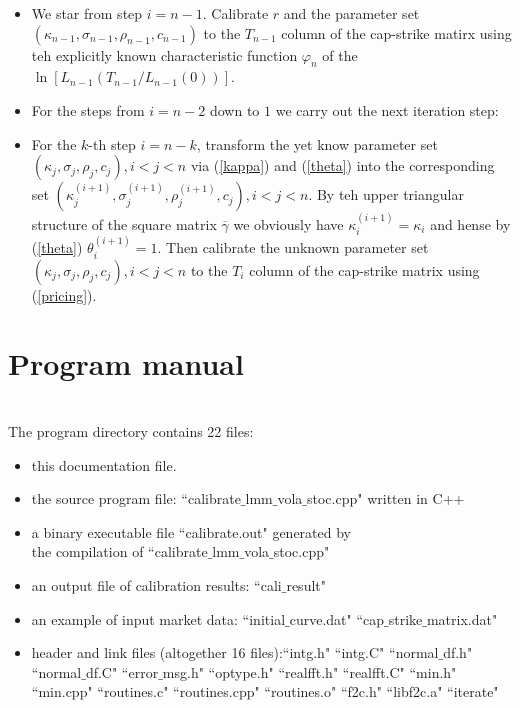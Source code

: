 \documentclass[12pt]{article}
\theoremstyle{definition}
\numberwithin{equation}{section} \theoremstyle{remark}
\begin{document}
\begin{itemize} \item We star from step $i=n-1$. Calibrate $r$ and the parameter set $(\kappa_{n-1}, \sigma_{n-1}, \rho_{n-1}, c_{n-1})$ to the $T_{n-1}$ column of the cap-strike matirx using teh explicitly known characteristic function $\varphi_n$ of the $\ln[L_{n-1}(T_{n-1}/L_{n-1}(0))]$.\\
\item For the steps from $i=n-2$ down to $1$ we carry out the next iteration step:\\
\item For the $k$-th step $i=n-k$, transform the yet know parameter set $(\kappa_j, \sigma_j, \rho_j, c_j), i<j<n$  via (\ref{kappa}) and (\ref{theta}) into the corresponding set $(\kappa_j^{(i+1)}, \sigma_j^{(i+1)}, \rho_j^{(i+1)}, c_j), i<j<n$. By teh upper triangular structure of the square matrix $\overline{\gamma}$ we obviously have $\kappa_i^{(i+1)}=\kappa_i$ and hense by (\ref{theta}) $\theta_i^{(i+1)}=1$. Then calibrate the unknown parameter set $(\kappa_j, \sigma_j, \rho_j, c_j), i<j<n$ to the $T_i$ column of the cap-strike matrix using (\ref{pricing}).\\
\end{itemize}


\section{Program manual}
\\
\noindent The program directory contains 22 files:\\
\begin{itemize}
\item this documentation file.
\item the source program file: ``calibrate$\_$lmm$\_$vola$\_$stoc.cpp" written in C++
\item a binary executable file ``calibrate.out" generated by\\
the compilation of ``calibrate$\_$lmm$\_$vola$\_$stoc.cpp"
\item an output file of calibration results: ``cali$\_$result"
\item an example of input market data: ``initial$\_$curve.dat"
``cap$\_$strike$\_$matrix.dat"
\item header and link files (altogether 16 files):``intg.h"   ``intg.C"   ``normal$\_$df.h"
``normal$\_$df.C" ``error$\_$msg.h" ``optype.h"
 ``realfft.h"    ``realfft.C"  ``min.h"   ``min.cpp"   ``routines.c"
``routines.cpp"   ``routines.o"   ``f2c.h"   ``libf2c.a"
``iterate"
\end{itemize}
\end{document}
